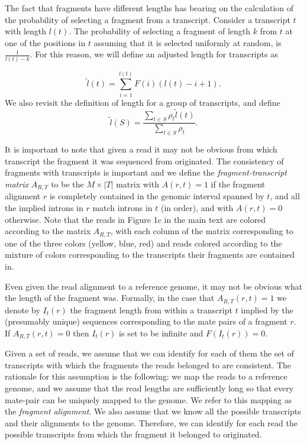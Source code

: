 \documentclass[12pt]{amsart}
\theoremstyle{definition}
\begin{document}
The fact that fragments have different lengths has bearing on the calculation
of the probability of selecting a fragment from a transcript. Consider a
transcript $t$ with length $l(t)$. The probability of selecting a fragment of
length $k$ from $t$ at one of the positions in $t$ assuming that it is
selected uniformly at random, is $\frac{1}{l(t)-k}$. For this reason, we will
define an adjusted length for transcripts as

\begin{equation}
\tilde{l}(t) = \sum_{i=1}^{l(t)} F(i)(l(t)-i+1).
\end{equation}
We also revisit the definition of length for a group of transcripts, and define 
\begin{equation}
\tilde{l}(S) =\frac{\sum_{t \in S} \rho_t\tilde{l}(t)}{\sum_{t \in S}\rho_t}.
\end{equation} 

It is important to note that given a read it may not be obvious from which
transcript the fragment it was sequenced from originated. The consistency of
fragments with transcripts is important and we define the {\em
fragment-transcript matrix} $A_{R,T}$ to be the $M \times |T|$ matrix with
$A(r,t)=1$ if the fragment alignment $r$ is completely contained in the
genomic interval spanned by $t$, and all the implied introns in $r$ match
introns in $t$ (in order), and with $A(r,t)=0$ otherwise. Note that the reads
in Figure 1c in the main text are colored according to the matrix $A_{R,T}$,
with each column of the matrix corresponding to one of the three colors
(yellow, blue, red) and reads colored according to the mixture of colors
corresponding to the transcripts their fragments are contained in.

Even given the read
alignment to a reference genome, it may not be obvious what the length of the
fragment was. Formally, in the case that $A_{R,T}(r,t)=1$ we denote by $I_t(r)$ the fragment length from within
a transcript $t$ implied by the (presumably unique) sequences corresponding to
the mate pairs of a fragment $r$. If $A_{R,T}(r,t)=0$ then $I_t(r)$ is set to be
infinite and $F(I_t(r)) = 0$. 

Given a set of reads, we assume that we can identify for each of them the set
of transcripts with which the fragments the reads belonged to are consistent. The
rationale for this assumption is the following: we map the reads to a
reference genome, and we assume that the read lengths are sufficiently long so
that every mate-pair can be uniquely mapped to the genome. We refer to this
mapping as the {\em fragment alignment}. We also assume that we know all the
possible transcripts and their alignments to the genome. Therefore, we can
identify for each read the possible transcripts from which the fragment it
belonged to originated.
\end{document}
